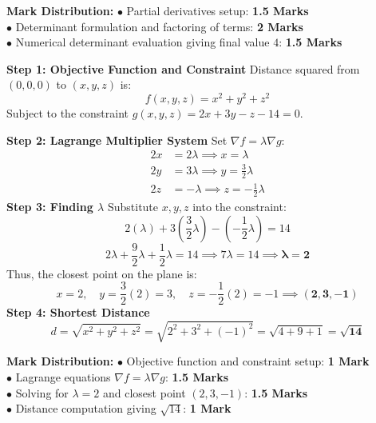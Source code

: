 \begin{solutionbox}
\begin{markingrubric}
\textbf{Mark Distribution:}
$\bullet$ Partial derivatives setup: \textbf{1.5 Marks}\\
$\bullet$ Determinant formulation and factoring of terms: \textbf{2 Marks}\\
$\bullet$ Numerical determinant evaluation giving final value $4$: \textbf{1.5 Marks}
\end{markingrubric}
\end{solutionbox}

\begin{solutionbox}
\textbf{Step 1: Objective Function and Constraint}
Distance squared from $(0,0,0)$ to $(x,y,z)$ is:
\[
f(x,y,z) = x^2 + y^2 + z^2
\]
Subject to the constraint $g(x,y,z) = 2x + 3y - z - 14 = 0$.

\textbf{Step 2: Lagrange Multiplier System}
Set $\nabla f = \lambda \nabla g$:
\begin{align*}
2x &= 2\lambda \implies x = \lambda \\
2y &= 3\lambda \implies y = \frac{3}{2}\lambda \\
2z &= -\lambda \implies z = -\frac{1}{2}\lambda
\end{align*}
\textbf{Step 3: Finding $\lambda$}
Substitute $x, y, z$ into the constraint:
\[
2(\lambda) + 3\left(\frac{3}{2}\lambda\right) - \left(-\frac{1}{2}\lambda\right) = 14
\]
\[
2\lambda + \frac{9}{2}\lambda + \frac{1}{2}\lambda = 14 \implies 7\lambda = 14 \implies \mathbf{\lambda = 2}
\]
Thus, the closest point on the plane is:
\[
x = 2, \quad y = \frac{3}{2}(2) = 3, \quad z = -\frac{1}{2}(2) = -1 \implies \mathbf{(2, 3, -1)}
\]
\textbf{Step 4: Shortest Distance}
\[
d = \sqrt{x^2 + y^2 + z^2} = \sqrt{2^2 + 3^2 + (-1)^2} = \sqrt{4 + 9 + 1} = \mathbf{\sqrt{14}}
\]

\begin{markingrubric}
\textbf{Mark Distribution:}
$\bullet$ Objective function and constraint setup: \textbf{1 Mark}\\
$\bullet$ Lagrange equations $\nabla f = \lambda \nabla g$: \textbf{1.5 Marks}\\
$\bullet$ Solving for $\lambda = 2$ and closest point $(2,3,-1)$: \textbf{1.5 Marks}\\
$\bullet$ Distance computation giving $\sqrt{14}$: \textbf{1 Mark}
\end{markingrubric}
\end{solutionbox}

